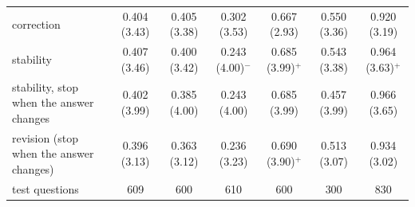 \begin{tabular}{lcccccc}
\quad correction & 0.404 (3.43) & 0.405 (3.38) & 0.302 (3.53) & 0.667 (2.93) & 0.550 (3.36) & 0.920 (3.19) \\
\quad stability & 0.407 (3.46) & 0.400 (3.42) & 0.243 (4.00)$^{-}$ & 0.685 (3.99)$^{+}$ & 0.543 (3.38) & 0.964 (3.63)$^{+}$ \\
\quad stability, stop when the answer changes & 0.402 (3.99) & 0.385 (4.00) & 0.243 (4.00) & 0.685 (3.99) & 0.457 (3.99) & 0.966 (3.65) \\
\quad revision (stop when the answer changes) & 0.396 (3.13) & 0.363 (3.12) & 0.236 (3.23) & 0.690 (3.90)$^{+}$ & 0.513 (3.07) & 0.934 (3.02) \\
\midrule
test questions & 609 & 600 & 610 & 600 & 300 & 830 \\
\bottomrule
\end{tabular}